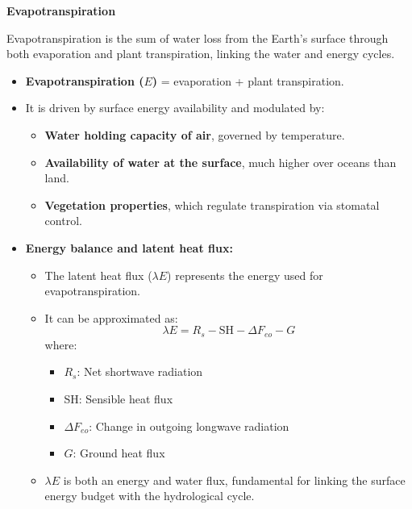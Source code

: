 \documentclass[fontsize=8pt, a4paper, landscape, fleqn]{scrartcl}
\renewcommand{\subsection}[1]{%
    \noindent\colorbox{subsectioncolor}{%
        \parbox{\dimexpr\columnwidth-2\fboxsep}{\color{white}\textbf{#1}}}%
    \vspace{0.5mm}%
}
\begin{document}
\begin{multicols*}{3}[\raggedcolumns]
\subsection{Evapotranspiration}

Evapotranspiration is the sum of water loss from the Earth's surface through both evaporation and plant transpiration, linking the water and energy cycles.

\begin{itemize}
    \item \textbf{Evapotranspiration ($E$)} = evaporation + plant transpiration.
    \item It is driven by surface energy availability and modulated by:
    \begin{itemize}
        \item \textbf{Water holding capacity of air}, governed by temperature.
        \item \textbf{Availability of water at the surface}, much higher over oceans than land.
        \item \textbf{Vegetation properties}, which regulate transpiration via stomatal control.
    \end{itemize}
    
    \item \textbf{Energy balance and latent heat flux:}
    \begin{itemize}
        \item The latent heat flux ($\lambda E$) represents the energy used for evapotranspiration.
        \item It can be approximated as:
        \[
        \lambda E = R_s - \text{SH} - \Delta F_{eo} - G
        \]
        where:
        \begin{itemize}
            \item $R_s$: Net shortwave radiation
            \item SH: Sensible heat flux
            \item $\Delta F_{eo}$: Change in outgoing longwave radiation
            \item $G$: Ground heat flux
        \end{itemize}
        \item $\lambda E$ is both an energy and water flux, fundamental for linking the surface energy budget with the hydrological cycle.
    \end{itemize}


\end{itemize}
\end{multicols*}
\end{document}
